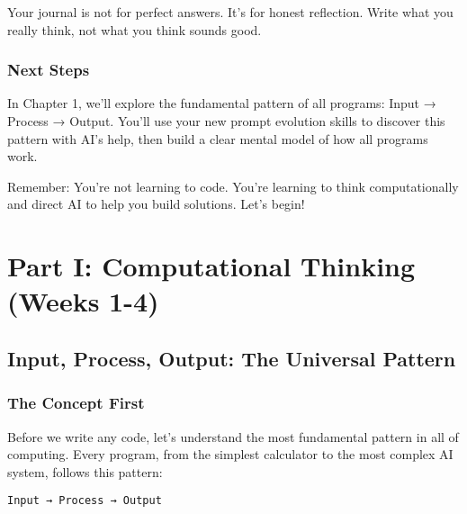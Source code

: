 \documentclass[
  letterpaper,
  DIV=11,
  numbers=noendperiod,
  oneside]{scrreprt}
\begin{document}
\begin{tcolorbox}[enhanced jigsaw, opacityback=0, colback=white, colframe=quarto-callout-tip-color-frame, breakable, titlerule=0mm, coltitle=black, rightrule=.15mm, colbacktitle=quarto-callout-tip-color!10!white, left=2mm, bottomtitle=1mm, bottomrule=.15mm, title=\textcolor{quarto-callout-tip-color}{\faLightbulb}\hspace{0.5em}{Journal Tip}, opacitybacktitle=0.6, toptitle=1mm, leftrule=.75mm, arc=.35mm, toprule=.15mm]

Your journal is not for perfect answers. It's for honest reflection.
Write what you really think, not what you think sounds good.

\end{tcolorbox}

\section{Next Steps}\label{next-steps}

In Chapter 1, we'll explore the fundamental pattern of all programs:
Input → Process → Output. You'll use your new prompt evolution skills to
discover this pattern with AI's help, then build a clear mental model of
how all programs work.

Remember: You're not learning to code. You're learning to think
computationally and direct AI to help you build solutions. Let's begin!

\part{Part I: Computational Thinking (Weeks 1-4)}

\chapter{Input, Process, Output: The Universal
Pattern}\label{sec-input-process-output}

\section{The Concept First}\label{the-concept-first}

Before we write any code, let's understand the most fundamental pattern
in all of computing. Every program, from the simplest calculator to the
most complex AI system, follows this pattern:

\begin{verbatim}
Input → Process → Output
\end{verbatim}
\end{document}
